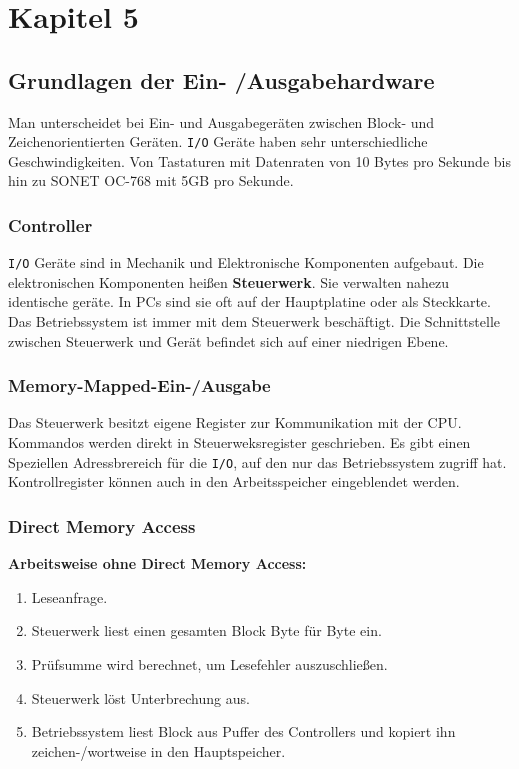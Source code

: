 \chapter{Kapitel 5}

\section{Grundlagen der Ein- /Ausgabehardware}

Man unterscheidet bei Ein- und Ausgabegeräten zwischen Block- und
Zeichenorientierten Geräten. \texttt{I/O} Geräte haben sehr unterschiedliche
Geschwindigkeiten. Von Tastaturen mit Datenraten von 10 Bytes pro Sekunde bis
hin zu SONET OC-768 mit 5GB pro Sekunde.

\subsection{Controller}

\texttt{I/O} Geräte sind in Mechanik und Elektronische Komponenten aufgebaut.
Die elektronischen Komponenten heißen \textbf{Steuerwerk}. Sie verwalten nahezu
identische geräte. In PCs sind sie oft auf der Hauptplatine oder als Steckkarte.
Das Betriebssystem ist immer mit dem Steuerwerk beschäftigt. Die Schnittstelle
zwischen Steuerwerk und Gerät befindet sich auf einer niedrigen Ebene.

\subsection{Memory-Mapped-Ein-/Ausgabe}

Das Steuerwerk besitzt eigene Register zur Kommunikation mit der CPU. Kommandos
werden direkt in Steuerweksregister geschrieben. Es gibt einen Speziellen
Adressbrereich für die \texttt{I/O}, auf den nur das Betriebssystem zugriff
hat. Kontrollregister können auch in den Arbeitsspeicher eingeblendet werden.

\subsection{Direct Memory Access}

\textbf{Arbeitsweise ohne Direct Memory Access:}

\begin{enumerate}
    \item Leseanfrage.
    \item Steuerwerk liest einen gesamten Block Byte für Byte ein.
    \item Prüfsumme wird berechnet, um Lesefehler auszuschließen.
    \item Steuerwerk löst Unterbrechung aus.
    \item Betriebssystem liest Block aus Puffer des Controllers und kopiert ihn
          zeichen-/wortweise in den Hauptspeicher.
\end{enumerate}

